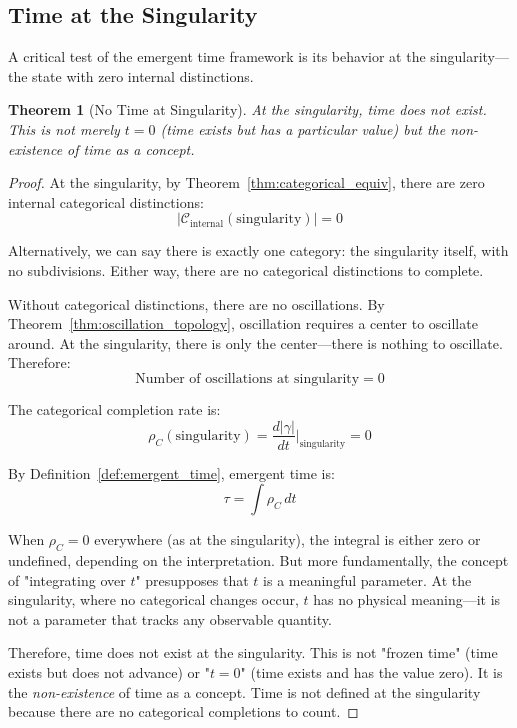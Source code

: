 \documentclass[12pt,a4paper]{article}
\newtheorem{theorem}{Theorem}[section]
\theoremstyle{definition}
\theoremstyle{remark}
\begin{document}
\subsection{Time at the Singularity}

A critical test of the emergent time framework is its behavior at the singularity—the state with zero internal distinctions.

\begin{theorem}[No Time at Singularity]
\label{thm:no_time_singularity}
At the singularity, time does not exist. This is not merely $t = 0$ (time exists but has a particular value) but the non-existence of time as a concept.
\end{theorem}

\begin{proof}
At the singularity, by Theorem~\ref{thm:categorical_equiv}, there are zero internal categorical distinctions:
\begin{equation}
|\mathcal{C}_{\text{internal}}(\text{singularity})| = 0
\end{equation}

Alternatively, we can say there is exactly one category: the singularity itself, with no subdivisions. Either way, there are no categorical distinctions to complete.

Without categorical distinctions, there are no oscillations. By Theorem~\ref{thm:oscillation_topology}, oscillation requires a center to oscillate around. At the singularity, there is only the center—there is nothing to oscillate. Therefore:
\begin{equation}
\text{Number of oscillations at singularity} = 0
\end{equation}

The categorical completion rate is:
\begin{equation}
\rho_C(\text{singularity}) = \frac{d|\gamma|}{dt}\bigg|_{\text{singularity}} = 0
\end{equation}

By Definition~\ref{def:emergent_time}, emergent time is:
\begin{equation}
\tau = \int \rho_C \, dt
\end{equation}

When $\rho_C = 0$ everywhere (as at the singularity), the integral is either zero or undefined, depending on the interpretation. But more fundamentally, the concept of "integrating over $t$" presupposes that $t$ is a meaningful parameter. At the singularity, where no categorical changes occur, $t$ has no physical meaning—it is not a parameter that tracks any observable quantity.

Therefore, time does not exist at the singularity. This is not "frozen time" (time exists but does not advance) or "$t = 0$" (time exists and has the value zero). It is the \emph{non-existence} of time as a concept. Time is not defined at the singularity because there are no categorical completions to count.
\end{proof}
\end{document}
